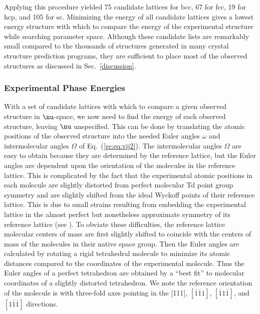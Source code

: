 \documentclass[preprint]{iucr}              %
\newcommand{\mb}[1]{\ensuremath{\mbox{\boldmath $ #1 $}}}
\begin{document}
Applying this procedure yielded 75 candidate lattices for bcc, 67 for fcc, 19
for hcp, and 105 for sc. Minimizing the energy of all
candidate lattices gives a lowest energy structure with which to
compare the energy of the experimental structure while searching
parameter space.  Although these candidate lists are remarkably small compared
to the thousands of structures generated in many crystal structure prediction
programs, they are sufficient to place most of the observed structures as
discussed in Sec.~\ref{discussion}.


\subsubsection{Experimental Phase Energies}

With a set of candidate lattices with which to compare a given observed
structure in $\mb{\nu}$-space, we now need to find the energy of each
observed structure, leaving $\mb{\nu}$ unspecified.  This can be done by
translating the atomic positions of the observed structure into the needed Euler
angles $\omega$ and intermolecular angles $\Omega$ of Eq.\
(\ref{re:eq:vij2}). The intermolecular angles $\Omega$
are easy to obtain because they are determined by the reference lattice, but the
Euler angles are dependent upon the orientation of the molecules in the
reference lattice. This is complicated by the fact that the experimental atomic
positions in each molecule are slightly distorted from perfect molecular Td
point group symmetry and are slightly shifted from the ideal Wyckoff points
of their reference lattice.  This is due to small strains resulting from
embedding the experimental lattice in the almost perfect but nonetheless
approximate symmetry of its reference lattice (see
\cite{McClurg09}). To obviate these difficulties, the reference lattice
molecular centers of mass are first slightly shifted to coincide with the
centers of mass of the molecules in their native space group.  Then the Euler angles are
calculated by rotating a rigid tetrahedral molecule to minimize its atomic
distances compared to the coordinates of the experimental molecule.  Thus the
Euler angles of a perfect tetrahedron are obtained by a ``best fit'' to
molecular coordinates of a slightly distorted tetrahedron. We note the reference
orientation of the molecule is with three-fold axes pointing in the [111],
$[\bar{1}\bar{1}1]$, $[\bar{1}1\bar{1}]$, and $[1\bar{1}\bar{1}]$ directions.
\end{document}
